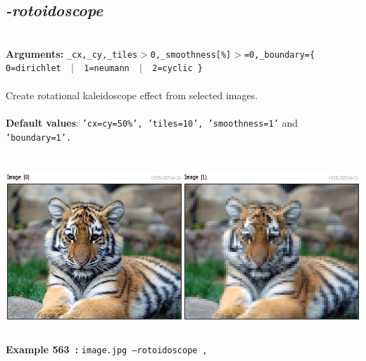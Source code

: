 \documentclass[a4paper,11pt,twoside]{book}
\begin{document}
\subsection{\emph{-rotoidoscope} }\vspace*{-0.5em}
~\\\textbf{Arguments: } 
{\small \texttt{\_cx,\_cy,\_tiles$>$0,\_smoothness[\%]$>$=0,\_boundary=\{ 0=dirichlet ~$|$~ 1=neumann ~$|$~ 2=cyclic \}}}\\~\\
Create rotational kaleidoscope effect from selected images.
~\\~\\\textbf{Default values}: {\small \texttt{'cx=cy=50\%', 'tiles=10', 'smoothness=1'} and \texttt{'boundary=1'.}}
\begin{center}\includegraphics[keepaspectratio=true,height=7cm,width=\textwidth]{img/gmic_def563.jpg}\\
{\footnotesize \textbf{Example 563~:} \texttt{image.jpg --rotoidoscope ,}}
\end{center}
\end{document}
